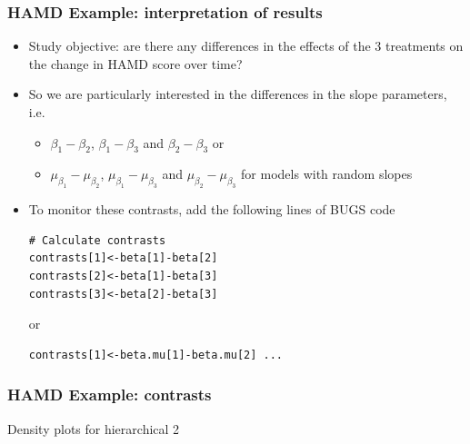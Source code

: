 \documentclass{beamer}
\begin{document}
\begin{frame}[containsverbatim]
    \frametitle{HAMD Example: interpretation of results}
    \begin{itemize}
        \item Study objective: are there any differences in the effects of the 3 treatments on the change in HAMD score over time?\vspace{2mm}
        \item So we are particularly interested in the differences in the slope parameters, i.e.~\vspace{1mm}
        \begin{itemize}
            \item $\beta_1-\beta_2$, $\beta_1-\beta_3$ and $\beta_2-\beta_3$ or\vspace{1mm}
            \item $\mu_{\beta_1}-\mu_{\beta_2}$, $\mu_{\beta_1}-\mu_{\beta_3}$ and $\mu_{\beta_2}-\mu_{\beta_3}$ for models with random slopes\vspace{2mm}
        \end{itemize}
        \item To monitor these contrasts, add the following lines of BUGS code
        \footnotesize
    \begin{verbatim}
# Calculate contrasts
contrasts[1]<-beta[1]-beta[2]
contrasts[2]<-beta[1]-beta[3]
contrasts[3]<-beta[2]-beta[3]		
    \end{verbatim}
    \vspace{-3mm}or
    \footnotesize
    \begin{verbatim}
contrasts[1]<-beta.mu[1]-beta.mu[2] ...
    \end{verbatim}
    \end{itemize}
\end{frame}

\begin{frame}
    \frametitle{HAMD Example: contrasts}
    \renewcommand{\arraystretch}{1.2}
    \setlength{\tabcolsep}{3pt}
    
    \setlength{\tabcolsep}{6pt}  %
    \renewcommand{\arraystretch}{1}
    Density plots for hierarchical 2
    \begin{center}
        \\
    \end{center}
\end{frame}
\end{document}
